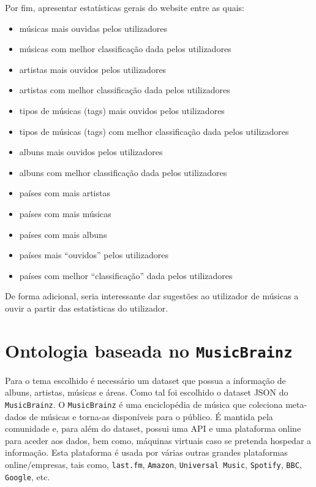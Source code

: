 \documentclass{article}
\begin{document}
Por fim, apresentar estatísticas gerais do website entre as quais:
\begin{itemize}
    \item músicas mais ouvidas pelos utilizadores
    \item músicas com melhor classificação dada pelos utilizadores
    \item artistas mais ouvidos pelos utilizadores
    \item artistas com melhor classificação dada pelos utilizadores
    \item tipos de músicas (tags) mais ouvidos pelos utilizadores
    \item tipos de músicas (tags) com melhor classificação dada pelos utilizadores
    \item albuns mais ouvidos pelos utilizadores
    \item albuns com melhor classificação dada pelos utilizadores
    \item países com mais artistas
    \item países com mais músicas
    \item países com mais albuns
    \item países mais ``ouvidos'' pelos utilizadores
    \item países com melhor ``classificação'' dada pelos utilizadores
\end{itemize}

De forma adicional, seria interessante dar sugestões ao utilizador de músicas a ouvir a partir das estatísticas do utilizador.

\section{Ontologia baseada no \texttt{MusicBrainz}} \label{ontologia}

Para o tema escolhido é necessário um dataset que possua a informação de albuns, artistas, músicas e áreas. Como tal foi escolhido o dataset JSON do \texttt{MusicBrainz}. O \texttt{MusicBrainz} é uma enciclopédia de música que coleciona meta-dados de músicas e torna-as disponíveis para o público. É mantida pela comunidade e, para além do dataset, possui uma API e uma plataforma online para aceder aos dados, bem como, máquinas virtuais caso se pretenda hospedar a informação. Esta plataforma é usada por várias outras grandes plataformas online/empresas, tais como, \texttt{last.fm}, \texttt{Amazon}, \texttt{Universal Music}, \texttt{Spotify}, \texttt{BBC}, \texttt{Google}, etc.
\end{document}
